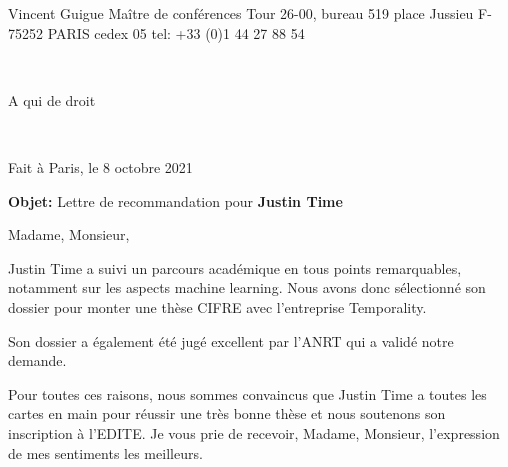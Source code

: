\documentclass[11pt]{letter}
\begin{document}
\pagestyle{empty}
\vspace*{-35mm}

\begin{minipage}{.5\textwidth}
 Vincent Guigue \newline
 Maître de conférences \newline
 Tour 26-00, bureau 519 place Jussieu \newline
  F-75252 PARIS cedex 05 \newline
tel: +33 (0)1 44 27 88 54
\end{minipage}

~\hfill
\begin{minipage}{.4\textwidth}
A qui de droit
\end{minipage}

\vspace*{5mm}

~\hfill
\begin{minipage}{.4\textwidth}
Fait à Paris, le 8 octobre 2021
\end{minipage}

\vspace*{10mm}
\textbf{Objet:} Lettre de recommandation pour \textbf{Justin Time}

\vfill 


Madame, Monsieur,\\
\vspace*{10mm}

Justin Time a suivi un parcours académique en tous points remarquables, notamment sur les aspects machine learning. Nous avons donc sélectionné son dossier pour monter une thèse CIFRE avec l'entreprise Temporality.
  
  Son dossier a également été jugé excellent par l'ANRT qui a validé notre demande.
  
  Pour toutes ces raisons, nous sommes convaincus que Justin Time a toutes les cartes en main pour réussir une très bonne thèse et nous soutenons son inscription à l'EDITE.
 Je vous prie de recevoir, Madame, Monsieur, l'expression de mes sentiments les meilleurs.
\end{document}

